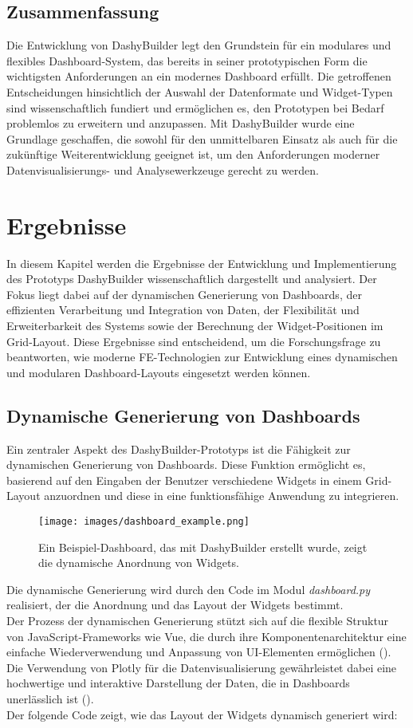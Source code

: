 \documentclass[a4paper, 12pt]{scrartcl}
\begin{document}
\subsection{Zusammenfassung}
Die Entwicklung von DashyBuilder legt den Grundstein für ein modulares und flexibles Dashboard-System, das bereits in seiner prototypischen Form die wichtigsten Anforderungen an ein modernes Dashboard erfüllt. Die getroffenen Entscheidungen hinsichtlich der Auswahl der Datenformate und Widget-Typen sind wissenschaftlich fundiert und ermöglichen es, den Prototypen bei Bedarf problemlos zu erweitern und anzupassen. Mit DashyBuilder wurde eine Grundlage geschaffen, die sowohl für den unmittelbaren Einsatz als auch für die zukünftige Weiterentwicklung geeignet ist, um den Anforderungen moderner Datenvisualisierungs- und Analysewerkzeuge gerecht zu werden.
\clearpage
	\section{Ergebnisse}
	\label{sec:ergebnisse}

In diesem Kapitel werden die Ergebnisse der Entwicklung und Implementierung des Prototyps DashyBuilder wissenschaftlich dargestellt und analysiert. Der Fokus liegt dabei auf der dynamischen Generierung von Dashboards, der effizienten Verarbeitung und Integration von Daten, der Flexibilität und Erweiterbarkeit des Systems sowie der Berechnung der Widget-Positionen im Grid-Layout. Diese Ergebnisse sind entscheidend, um die Forschungsfrage zu beantworten, wie moderne \ac{FE}-Technologien zur Entwicklung eines dynamischen und modularen Dashboard-Layouts eingesetzt werden können.
\subsection{Dynamische Generierung von Dashboards}
Ein zentraler Aspekt des DashyBuilder-Prototyps ist die Fähigkeit zur dynamischen Generierung von Dashboards. Diese Funktion ermöglicht es, basierend auf den Eingaben der Benutzer verschiedene Widgets in einem Grid-Layout anzuordnen und diese in eine funktionsfähige Anwendung zu integrieren.
\begin{figure}[H]
    \centering
    \texttt{[image: images/dashboard\_example.png]}
    \caption{Ein Beispiel-Dashboard, das mit DashyBuilder erstellt wurde, zeigt die dynamische Anordnung von Widgets.}
    \label{fig:dashboard_example}
\end{figure}
Die dynamische Generierung wird durch den Code im Modul \textit{dashboard.py} realisiert, der die Anordnung und das Layout der Widgets bestimmt.\\[1em]Der Prozess der dynamischen Generierung stützt sich auf die flexible Struktur von JavaScript-Frameworks wie \ac{Vue}, die durch ihre Komponentenarchitektur eine einfache Wiederverwendung und Anpassung von UI-Elementen ermöglichen (\cite{Alasaad2022}). Die Verwendung von Plotly für die Datenvisualisierung gewährleistet dabei eine hochwertige und interaktive Darstellung der Daten, die in Dashboards unerlässlich ist (\cite{Clement2020}).\\[1em] 
Der folgende Code zeigt, wie das Layout der Widgets dynamisch generiert wird:
\end{document}
